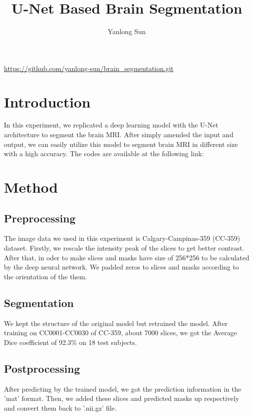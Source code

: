 \documentclass[12pt]{article}
\date{}
\title{U-Net Based Brain Segmentation}
\author{Yanlong Sun}
\begin{document}
\maketitle
 \urldef{\myurl}\url{https://github.com/yanlong-sun/brain_segmentation.git}
\thispagestyle{empty}

\section{Introduction}
In this experiment, we replicated a deep learning model with the U-Net architecture \cite{buda} to segment the brain MRI. After simply amended the input and output, we can easily utilize this model to segment brain MRI in different size with a high accuracy. The codes are available at the following link: \myurl
\section{Method}

\subsection{Preprocessing}
The image data we used in this experiment is Calgary-Campinas-359 \cite{dataset}(CC-359) dataset. Firstly, we rescale the intensity peak of the slices to get better contrast. After that, in oder to make slices and masks have size of 256*256 to be calculated by the deep neural network. We padded zeros to slices and masks according to the orientation of the them.  

\subsection{Segmentation}
We kept the structure of the original model but retrained the model. After training on CC0001-CC0030 of CC-359, about 7000 slices, we got the Average Dice coefficient of 92.3\% on 18 test subjects.

\subsection{Postprocessing}
After predicting by the trained model, we got the prediction information in the 'mat' format. Then, we added these slices and predicted masks up respectively and convert them back to '.nii.gz' file.







\end{document}
